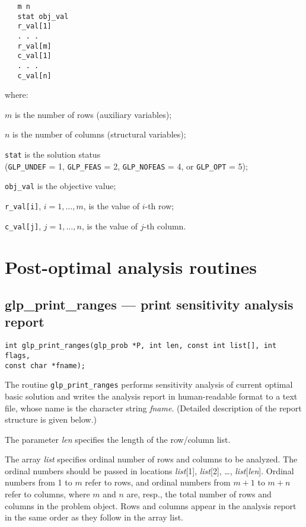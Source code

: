 \begin{verbatim}
   m n
   stat obj_val
   r_val[1]
   . . .
   r_val[m]
   c_val[1]
   . . .
   c_val[n]
\end{verbatim}

\noindent
where:

\noindent
$m$ is the number of rows (auxiliary variables);

\noindent
$n$ is the number of columns (structural variables);

\noindent
\verb|stat| is the solution status\\(\verb|GLP_UNDEF| = 1,
\verb|GLP_FEAS| = 2, \verb|GLP_NOFEAS| = 4, or \verb|GLP_OPT| = 5);

\noindent
\verb|obj_val| is the objective value;

\noindent
\verb|r_val[i]|, $i=1,\dots,m$, is the value of $i$-th row;

\noindent
\verb|c_val[j]|, $j=1,\dots,n$, is the value of $j$-th column.


\newpage

\section{Post-optimal analysis routines}

\subsection{glp\_print\_ranges --- print sensitivity analysis report}

\synopsis

{\tt int glp\_print\_ranges(glp\_prob *P, int len, const int list[],
int flags,\\
\hspace*{134pt}const char *fname);}

\description

The routine \verb|glp_print_ranges| performs sensitivity analysis of
current optimal basic solution and writes the analysis report in
human-readable format to a text file, whose name is the character
string {\it fname}. (Detailed description of the report structure is
given below.)

The parameter {\it len} specifies the length of the row/column list.

The array {\it list} specifies ordinal number of rows and columns to be
analyzed. The ordinal numbers should be passed in locations
{\it list}[1], {\it list}[2], \dots, {\it list}[{\it len}]. Ordinal
numbers from 1 to $m$ refer to rows, and ordinal numbers from $m+1$ to
$m+n$ refer to columns, where $m$ and $n$ are, resp., the total number
of rows and columns in the problem object. Rows and columns appear in
the analysis report in the same order as they follow in the array list.

